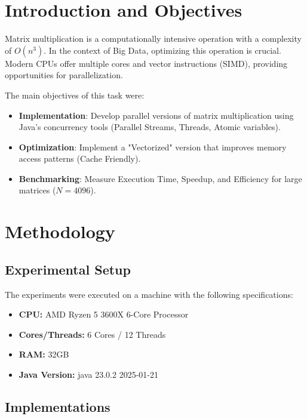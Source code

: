 \documentclass[a4paper,12pt]{article}
\begin{document}
\newpage

\section{Introduction and Objectives}

Matrix multiplication is a computationally intensive operation with a complexity of $O(n^3)$. In the context of Big Data, optimizing this operation is crucial. Modern CPUs offer multiple cores and vector instructions (SIMD), providing opportunities for parallelization.

The main objectives of this task were:
\begin{itemize}
    \item \textbf{Implementation}: Develop parallel versions of matrix multiplication using Java's concurrency tools (Parallel Streams, Threads, Atomic variables).
    \item \textbf{Optimization}: Implement a "Vectorized" version that improves memory access patterns (Cache Friendly).
    \item \textbf{Benchmarking}: Measure Execution Time, Speedup, and Efficiency for large matrices ($N=4096$).
\end{itemize}

\section{Methodology}

\subsection{Experimental Setup}
The experiments were executed on a machine with the following specifications:
\begin{itemize}
    \item \textbf{CPU:} AMD Ryzen 5 3600X 6-Core Processor %
    \item \textbf{Cores/Threads:} 6 Cores / 12 Threads %
    \item \textbf{RAM:} 32GB %
    \item \textbf{Java Version:} java 23.0.2 2025-01-21
\end{itemize}

\subsection{Implementations}
\end{document}
